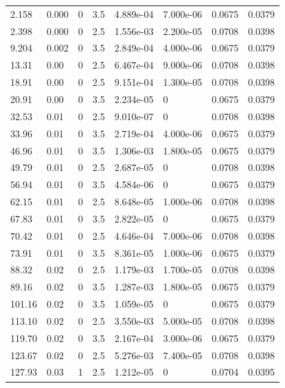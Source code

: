 \documentclass[preview]{standalone}
\begin{document}
{{\begin{tabular}{L{1.2cm}C{1.2cm} C{0.3cm}C{0.5cm} C{1.4cm}C{1.4cm} C{1.4cm}C{1.4cm}}
  2.158  &  0.000  & 0     & 3.5 &  4.889e-04  & 7.000e-06  & 0.0675 &  0.0379   \\ 
  2.398  &  0.000  & 0     & 2.5 &  1.556e-03  & 2.200e-05  & 0.0708 &  0.0398   \\ 
  9.204  &  0.002  & 0     & 3.5 &  2.849e-04  & 4.000e-06  & 0.0675 &  0.0379   \\ 
  13.31  &  0.00  & 0     & 2.5 &  6.467e-04  & 9.000e-06  & 0.0708 &  0.0398   \\ 
  18.91  &  0.00  & 0     & 2.5 &  9.151e-04  & 1.300e-05  & 0.0708 &  0.0398   \\ 
  20.91  &  0.00  & 0     & 3.5 &  2.234e-05  & 0  & 0.0675 &  0.0379   \\ 
  32.53  &  0.01  & 0     & 2.5 &  9.010e-07  & 0  & 0.0708 &  0.0398   \\ 
  33.96  &  0.01  & 0     & 3.5 &  2.719e-04  & 4.000e-06  & 0.0675 &  0.0379   \\ 
  46.96  &  0.01  & 0     & 3.5 &  1.306e-03  & 1.800e-05  & 0.0675 &  0.0379   \\ 
  49.79  &  0.01  & 0     & 2.5 &  2.687e-05  & 0  & 0.0708 &  0.0398   \\ 
  56.94  &  0.01  & 0     & 3.5 &  4.584e-06  & 0  & 0.0675 &  0.0379   \\ 
  62.15  &  0.01  & 0     & 2.5 &  8.648e-05  & 1.000e-06  & 0.0708 &  0.0398   \\ 
  67.83  &  0.01  & 0     & 3.5 &  2.822e-05  & 0  & 0.0675 &  0.0379   \\ 
  70.42  &  0.01  & 0     & 2.5 &  4.646e-04  & 7.000e-06  & 0.0708 &  0.0398   \\ 
  73.91  &  0.01  & 0     & 3.5 &  8.361e-05  & 1.000e-06  & 0.0675 &  0.0379   \\ 
  88.32  &  0.02  & 0     & 2.5 &  1.179e-03  & 1.700e-05  & 0.0708 &  0.0398   \\ 
  89.16  &  0.02  & 0     & 3.5 &  1.287e-03  & 1.800e-05  & 0.0675 &  0.0379   \\ 
  101.16  &  0.02  & 0     & 3.5 &  1.059e-05  & 0  & 0.0675 &  0.0379   \\ 
  113.10  &  0.02  & 0     & 2.5 &  3.550e-03  & 5.000e-05  & 0.0708 &  0.0398   \\ 
  119.70  &  0.02  & 0     & 3.5 &  2.167e-04  & 3.000e-06  & 0.0675 &  0.0379   \\ 
  123.67  &  0.02  & 0     & 2.5 &  5.276e-03  & 7.400e-05  & 0.0708 &  0.0398   \\ 
  127.93  &  0.03  & 1     & 2.5 &  1.212e-05  & 0  & 0.0704 &  0.0395   \\ 

\end{tabular}}}
\end{document}
